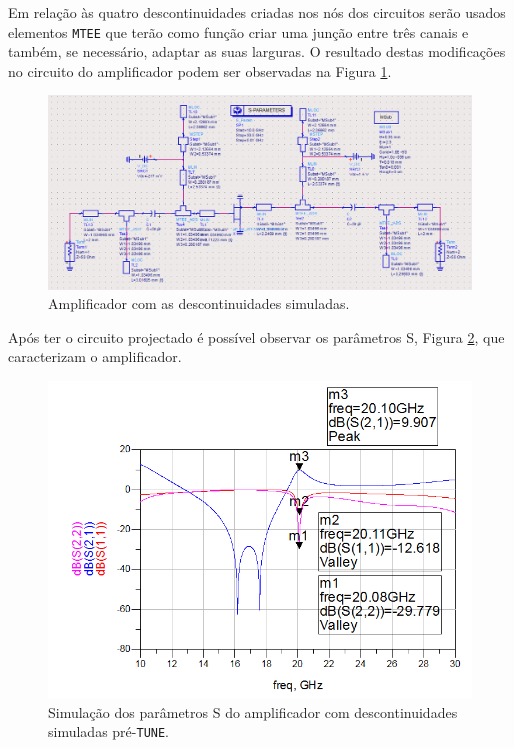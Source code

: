 \documentclass[11pt]{article}
\numberwithin{equation}{section}
\begin{document}
Em relação às quatro descontinuidades criadas nos nós dos circuitos serão usados elementos \texttt{MTEE} que terão como função criar uma junção entre três canais e também, se necessário, adaptar as suas larguras. O resultado destas modificações no circuito do amplificador podem ser observadas na Figura \ref{fig:Circuito_pre_tune}.

\begin{figure}[H]
	\centering
	\includegraphics[keepaspectratio=true, scale=0.45]{exps/Circuito_descont_pre_tune}
	\vspace{-0.5em}
	\caption{Amplificador com as descontinuidades simuladas.}
	\vspace{-0.8em}
	\label{fig:Circuito_pre_tune}
\end{figure}

Após ter o circuito projectado é possível observar os parâmetros S, Figura \ref{fig:descont_S_pre_tune}, que caracterizam o amplificador.

\begin{figure}[H]
	\centering
	\includegraphics[keepaspectratio=true, scale=0.45]{exps/descont_S_pre_tune}
	\vspace{-0.5em}
	\caption{Simulação dos parâmetros S do amplificador com descontinuidades simuladas pré-\texttt{TUNE}.}
	\vspace{-0.8em}
	\label{fig:descont_S_pre_tune}
\end{figure}
\end{document}
